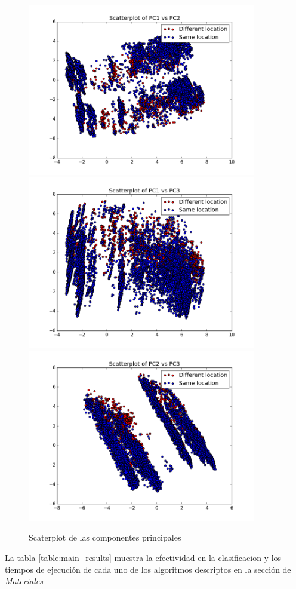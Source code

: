 \documentclass[journal]{IEEEtran}
\begin{document}
\begin{figure}[!h]
\label{fig:pca_scatterplot}
\caption{Scaterplot de las componentes principales}
\centering
\includegraphics[width=10cm,keepaspectratio]{pca1_vs_pca2.png}
\includegraphics[width=10cm,keepaspectratio]{pca1_vs_pca3.png}
\includegraphics[width=10cm,keepaspectratio]{pca2_vs_pca3.png}
\end{figure}


La tabla \ref{table:main_results} muestra la efectividad en la clasificacion
y los tiempos de ejecución de cada uno de los algoritmos descriptos en
la sección de \textit{Materiales}
\end{document}
